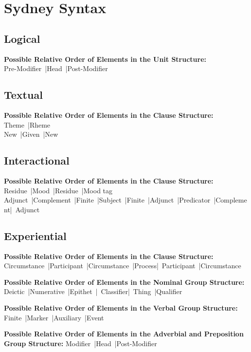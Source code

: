 \section{Sydney Syntax}
\subsection{Logical}

\noindent\textbf{Possible Relative Order of Elements in the Unit Structure:} \\ \noindent
Pre-Modifier~|Head~|Post-Modifier

\subsection{Textual}
\noindent\textbf{Possible Relative Order of Elements in the Clause Structure:} \\ \noindent
Theme~|Rheme \\
New~|Given~|New

\subsection{Interactional}
\noindent\textbf{Possible Relative Order of Elements in the Clause Structure:} \\ \noindent
Residue~|Mood~|Residue~|Mood tag \\
Adjunct~|Complement~|Finite~|Subject~|Finite~|Adjunct~|Predicator~|Complement|~Adjunct

\subsection{Experiential}
\noindent\textbf{Possible Relative Order of Elements in the Clause Structure:} \\ \noindent
Circumstance~|Participant~|Circumstance~|Process|~Participant~|Circumstance

\noindent\textbf{Possible Relative Order of Elements in the Nominal Group Structure:} \\ \noindent
Deictic~|Numerative~|Epithet~|~Classifier|~Thing~|Qualifier

\noindent\textbf{Possible Relative Order of Elements in the Verbal Group Structure:} \\ \noindent
Finite~|Marker~|Auxiliary~|Event

\noindent\textbf{Possible Relative Order of Elements in the Adverbial and Preposition Group Structure:} \noindent Modifier~|Head~|Post-Modifier

